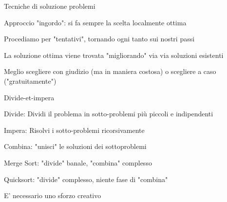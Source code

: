 \begin{frame}{Tecniche di soluzione problemi}

\begin{myboxtitle}
\BI
\item Approccio "ingordo": si fa sempre la scelta localmente ottima
\EI
\end{myboxtitle}

\begin{myboxtitle}[Backtrack]
\BI
\item Procediamo per "tentativi", tornando ogni tanto sui nostri passi
\EI
\end{myboxtitle}

\begin{myboxtitle}
\BI
\item La soluzione ottima viene trovata "migliorando" via via soluzioni esistenti
\EI
\end{myboxtitle}

\begin{myboxtitle}
\BI
\item Meglio scegliere con giudizio (ma in maniera costosa) o scegliere a caso ("gratuitamente")
\EI
\end{myboxtitle}

\end{frame}

\begin{frame}{Divide-et-impera}
\BIL
\item \alert{Divide}: Dividi il problema in sotto-problemi più piccoli e indipendenti
\item \alert{Impera}: Risolvi i sotto-problemi ricorsivamente
\item \alert{Combina}: "unisci" le soluzioni dei sottoproblemi
\EIL

\bigskip
{}
\BIL
\item Merge Sort: "divide" banale, "combina" complesso
\item Quicksort: "divide" complesso, niente fase di "combina"
\item E' necessario uno sforzo creativo
\EIL

\end{frame}

